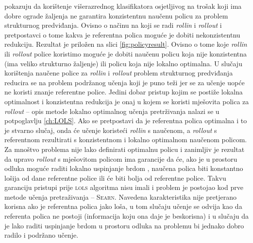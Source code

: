 \cite{daume15lols} pokazuju da korištenje višerazrednog klasifikatora
osjetljivog na trošak koji ima dobre ograde žaljenja ne garantira konzistentnu
naučenu policu za problem strukturnog predviđanja. Ovisno o načinu na koji se
radi \textit{rollin} i \textit{rollout} i pretpostavci o tome kakva je
referentna polica moguće je dobiti nekonzistentnu redukciju. Rezultat je
priložen na slici \ref{fig:policyresult}. Ovisno o tome koje \textit{rollin} ili
\textit{rollout} police koristimo moguće je dobiti naučenu policu koja nije
konzistentna (ima veliko strukturno žaljenje) ili policu koja nije lokalno
optimalna. U slučaju korištenja naučene police za \textit{rollin} i
\textit{rollout} problem strukturnog predviđanja reducira se na problem
podržanog učenja koji je puno teži jer se za učenje uopće ne koristi znanje
referentne police. Jedini dobar pristup kojim se postiže lokalna optimalnost i
konzistentna redukcija je onaj u kojem se koristi mješovita polica za
\textit{rollout} -- opis metode lokalno optimalnog učenja pretrživanja nalazi se
u potpoglavlju \ref{ch:LOLS}. Ako se pretpostavi da je referentna polica
optimalna i to je stvarno slučaj, onda će učenje koristeći \textit{rollin} s
naučenom, a \textit{rollout} s referentnom rezultirati s konzistentnom i
lokalno optimalnom naučenom policom. Za mnoštvo problema nije lako definirati
optimalnu policu i zanimljiv je rezultat da upravo \textit{rollout} s mješovitom
policom ima garancije da će, ako je u prostoru odluka moguće raditi lokalno
uspinjanje brdom , naučena polica biti konstantno
lošija od dane referentne police ili će biti bolja od referentne police. Takvu
garanciju pristupi prije \textsc{lols} algoritma nisu imali i problem je
postojao kod prve metode učenja pretraživanja -- \textsc{Searn}. Navedena
karakteristika nije pretjerano korisna ako je referentna polica jako loša, u tom
slučaju učenje se odvija kao da referenta polica ne postoji (informacija koju
ona daje je beskorisna) i u slučaju da je lako raditi uspinjanje brdom u
prostoru odluka na problemu bi jednako dobro radilo i podržano učenje.

